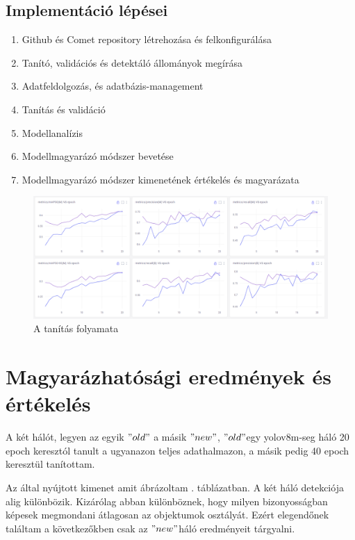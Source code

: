 \documentclass[12pt,oneside,a4paper]{article}
\newcommand{\newsection}[1]{\clearpage\section{#1}}\label{makro}
\theoremstyle{remark}
\newcommand{\oldh}{\( "old" \)}\label{makro2}
\newcommand{\newh}{\( "new" \)}
\begin{document}
\subsection{Implementáció lépései}\label{subsec:impelemntacio}
\begin{enumerate}
        \item Github és Comet repository létrehozása és felkonfigurálása
        \item Tanító, validációs és detektáló állományok megírása
        \item Adatfeldolgozás, és adatbázis-management
        \item Tanítás és validáció
        \item Modellanalízis
        \item Modellmagyarázó módszer bevetése
        \item Modellmagyarázó módszer kimenetének értékelés és magyarázata
\end{enumerate}
\begin{figure}[ht]
    \centering
    \includegraphics[width=1\linewidth]{modelltanitas}
    \caption{A tanítás folyamata}
    \label{fig:tanitas}
\end{figure}

\newsection{Magyarázhatósági eredmények és értékelés}\label{sec:magyarazhatosagi-eredmenyek-es-ertekeles}
    A két hálót, legyen az egyik \oldh\label{makrohasznalat} a másik \newh, \oldh egy yolov8m-seg háló 20
    \gls{epoch} keresztól tanult a ugyanazon teljes adathalmazon, a másik pedig 40 \gls{epoch} keresztül tanítottam.


    Az  által nyújtott kimenet amit ábrázoltam .
    táblázatban\label{hivatkozas}.
    A két háló detekciója alig különbözik.
    Kizárólag abban különböznek, hogy milyen bizonyosságban képesek megmondani átlagosan az objektumok osztályát.
    Ezért elegendőnek találtam a következőkben csak az \newh háló eredményeit tárgyalni.
\end{document}
